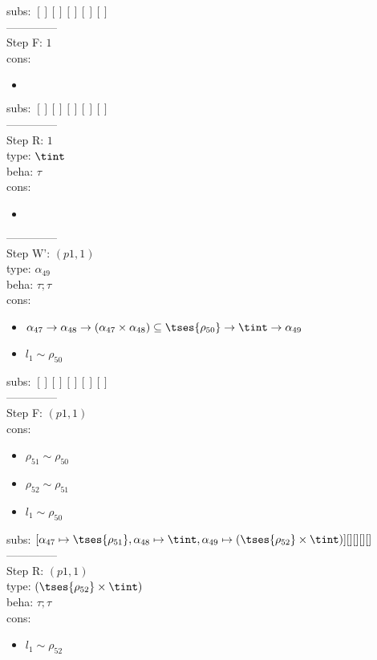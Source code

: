 \documentclass[12pt]{article}
\begin{document}
  subs:  $ [ ] [] [] [] [] $  
 \\--------------\\ 
Step F: $ 1 $
 \\ cons: \begin{itemize}
\item $  $
\end{itemize}
 subs:  $ [ ] [] [] [] [] $ 
  \\--------------\\ 
Step R: $ 1 $\\
  type: $ \tint $ 
\\  beha: $ \tau $ 
\\  cons: \begin{itemize}
\item $  $
\end{itemize} 
  --------------\\ 
Step W': $ (p1, 1) $\\
  type: $ \alpha_{49} $ 
\\  beha: $ \tau; \tau $ 
\\  cons: \begin{itemize}
\item $ \alpha_{47} \rightarrow \alpha_{48} \rightarrow (\alpha_{47} \times \alpha_{48}) \subseteq  \tses{ \rho_{50}} \rightarrow \tint \rightarrow \alpha_{49} $
\item $ l_{1} \sim\rho_{50} $
\end{itemize} 
  subs:  $ [ ] [] [] [] [] $  
 \\--------------\\ 
Step F: $ (p1, 1) $
 \\ cons: \begin{itemize}
\item $ \rho_{51} \sim\rho_{50} $
\item $ \rho_{52} \sim\rho_{51} $
\item $ l_{1} \sim\rho_{50} $
\end{itemize}
 subs:  $ [ \alpha_{47}\mapsto \tses{ \rho_{51}}, \alpha_{48}\mapsto\tint, \alpha_{49}\mapsto( \tses{ \rho_{52}} \times \tint)] [] [] [] [] $ 
  \\--------------\\ 
Step R: $ (p1, 1) $\\
  type: $ ( \tses{ \rho_{52}} \times \tint) $ 
\\  beha: $ \tau; \tau $ 
\\  cons: \begin{itemize}
\item $ l_{1} \sim\rho_{52} $
\end{itemize} 
\end{document}

